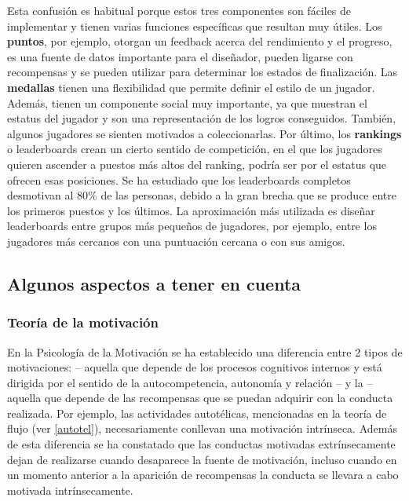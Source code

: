 Esta confusión es habitual porque estos tres componentes son fáciles de implementar y tienen varias funciones específicas que resultan muy útiles.
%
Los \textbf{puntos}, por ejemplo, otorgan un feedback acerca del rendimiento y el progreso, es una fuente de datos importante para el diseñador, pueden ligarse con recompensas y se pueden utilizar para determinar los estados de finalización.
%
Las \textbf{medallas} tienen una flexibilidad que permite definir el estilo de un jugador. 
%
Además, tienen un componente social muy importante, ya que muestran el estatus del jugador y son una representación de los logros conseguidos. 
%
También, algunos jugadores se sienten motivados a coleccionarlas.
%
Por último, los \textbf{rankings} o leaderboards crean un cierto sentido de competición, en el que los jugadores quieren ascender a puestos más altos del ranking, podría ser por el estatus que ofrecen esas posiciones.
%
Se ha estudiado que los leaderboards completos desmotivan al 80\% de las personas, debido a la gran brecha que se produce entre los primeros puestos y los últimos.
%
La aproximación más utilizada es diseñar leaderboards entre grupos más pequeños de jugadores, por ejemplo, entre los jugadores más cercanos con una puntuación cercana o con sus amigos.

\subsection{Algunos aspectos a tener en cuenta}

\subsubsection{Teoría de la motivación}
\label{SDT}
En la Psicología de la Motivación se ha establecido una diferencia entre 2 tipos de motivaciones\cite{SDT}:   -- aquella que depende de los procesos cognitivos internos y está dirigida por el sentido de la autocompetencia, autonomía y relación -- y la  -- aquella que depende de las recompensas que se puedan adquirir con la conducta realizada.
%
Por ejemplo, las actividades autotélicas, mencionadas en la teoría de flujo (ver \ref{autotel}), necesariamente conllevan una motivación intrínseca.
%
Además de esta diferencia se ha constatado que las conductas motivadas extrínsecamente dejan de realizarse cuando desaparece la fuente de motivación, incluso cuando en un momento anterior a la aparición de recompensas la conducta se llevara a cabo motivada intrínsecamente.


